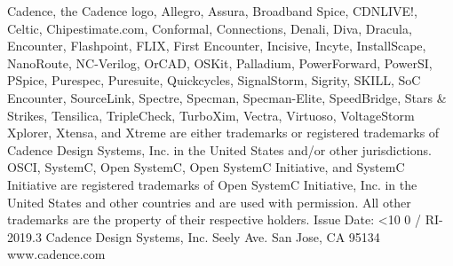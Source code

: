 \documentclass[twoside]{book}
\newcommand{\+}{\discretionary{\mbox{\scriptsize$\hookleftarrow$}}{}{}}
\newcommand{\clearemptydoublepage}{%
  \newpage{\pagestyle{empty}\cleardoublepage}%
}
\newcommand{\twodigits}[1]{%
  \ifnum#1<10 0#1\else #1\fi
}
\begin{document}
\begin{titlepage}
{\vspace*{0.2cm}
\newline Cadence, the Cadence logo, Allegro, Assura, Broadband Spice, CDNLIVE!, Celtic, Chipestimate.com, Conformal, Connections, Denali, Diva, Dracula, Encounter, Flashpoint, FLIX, First Encounter, Incisive, Incyte, InstallScape, NanoRoute, NC-Verilog, OrCAD, OSKit, Palladium, PowerForward, PowerSI, PSpice, Purespec, Puresuite, Quickcycles, SignalStorm, Sigrity, SKILL, SoC Encounter, SourceLink, Spectre, Specman, Specman-Elite, SpeedBridge, Stars \& Strikes, Tensilica, TripleCheck, TurboXim, Vectra, Virtuoso, VoltageStorm Xplorer, Xtensa, and Xtreme are either trademarks or registered trademarks of Cadence Design Systems, Inc. in the United States and/or other jurisdictions. 
OSCI, SystemC, Open SystemC, Open SystemC Initiative, and SystemC Initiative are registered trademarks of Open SystemC Initiative, Inc. in the United States and other countries and are used with permission. All other trademarks are the property of their respective holders.
\vspace*{2.5cm}
\newline Issue Date: \twodigits{\the\month}/{\the\year}
\newline RI-2019.3
\vspace*{0.4cm}
\newline
\vspace*{0.5cm}
\newline Cadence Design Systems, Inc.
 Seely Ave.
\newline San Jose, CA 95134
\newline www.cadence.com
}
\end{titlepage}
\clearemptydoublepage

{}
\tableofcontents
\clearemptydoublepage
{}
\listoftables
\clearemptydoublepage
{}
\listoffigures
\clearemptydoublepage

\hypersetup{pageanchor=true}

\end{document}

